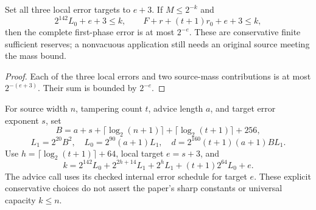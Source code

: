 \begin{theorem}
  \label{thm:lowerbounds-algebraic-affine-phase-one-dyadic}
  \leanok
  Set all three local error targets to $e+3$. If $M\le2^{-k}$ and
  \[
    2^{142}L_0+e+3\le k,\qquad
    F+r+(t+1)r_0+e+3\le k,
  \]
  then the complete first-phase error is at most $2^{-e}$.
  These are conservative finite sufficient reserves; a nonvacuous
  application still needs an original source meeting the mass bound.
\end{theorem}
\begin{proof}
  \leanok
  Each of the three local errors and two source-mass contributions
  is at most $2^{-(e+3)}$. Their sum is bounded by $2^{-e}$.
\end{proof}

\begin{definition}
  \label{def:lowerbounds-algebraic-affine-phase-one-parameters}
  \leanok
  For source width $n$, tampering count $t$, advice length $a$, and
  target error exponent $s$, set
  \[
    B=a+s+\lceil\log_2(n+1)\rceil+\lceil\log_2(t+1)\rceil+256,
  \]
  \[
    L_1=2^{20}B^2,\quad L_0=2^{90}(a+1)L_1,\quad
    d=2^{160}(t+1)(a+1)BL_1.
  \]
  Use $h=\lceil\log_2(t+1)\rceil+64$, local target $e=s+3$, and
  \[
    k=2^{142}L_0+2^{2h+14}L_1+2^hL_1+(t+1)2^{64}L_0+e.
  \]
  The advice call uses its checked internal error schedule for target
  $e$. These explicit conservative choices do not assert the paper's
  sharp constants or universal capacity $k\le n$.
\end{definition}

